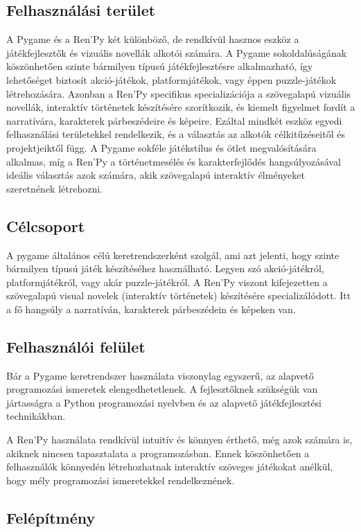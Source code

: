 \subsection{Felhasználási terület}
A Pygame és a Ren'Py két különböző, de rendkívül hasznos eszköz a játékfejlesztők és vizuális novellák alkotói számára. A Pygame sokoldalúságának köszönhetően szinte bármilyen típusú játékfejlesztésre alkalmazható, így lehetőséget biztosít akció-játékok, platformjátékok, vagy éppen puzzle-játékok létrehozására. Azonban a Ren'Py specifikus specializációja a szövegalapú vizuális novellák, interaktív történetek készítésére szorítkozik, és kiemelt figyelmet fordít a narratívára, karakterek párbeszédeire és képeire. Ezáltal mindkét eszköz egyedi felhasználási területekkel rendelkezik, és a választás az alkotók célkitűzéseitől és projektjeiktől függ. A Pygame sokféle játékstílus és ötlet megvalósítására alkalmas, míg a Ren'Py a történetmesélés és karakterfejlődés hangsúlyozásával ideális választás azok számára, akik szövegalapú interaktív élményeket szeretnének létrehozni.

\subsection{Célcsoport}

A pygame általános célú keretrendszerként szolgál, ami azt jelenti, hogy szinte bármilyen típusú játék készítéséhez használható. Legyen szó akció-játékról, platformjátékról, vagy akár puzzle-játékról.
A Ren'Py viszont kifejezetten a szövegalapú visual novelek (interaktív történetek) készítésére specializálódott. Itt a fő hangsúly a narratíván, karakterek párbeszédein és képeken van.

\subsection{Felhasználói felület}

Bár a Pygame keretrendszer használata viszonylag egyszerű, az alapvető programozási ismeretek elengedhetetlenek. A fejlesztőknek szükségük van jártasságra a Python programozási nyelvben és az alapvető játékfejlesztési technikákban.

A Ren'Py használata rendkívül intuitív és könnyen érthető, még azok számára is, akiknek nincsen tapasztalata a programozásban. Ennek köszönhetően a felhasználók könnyedén létrehozhatnak interaktív szöveges játékokat anélkül, hogy mély programozási ismeretekkel rendelkeznének.
\subsection{Felépítmény}

